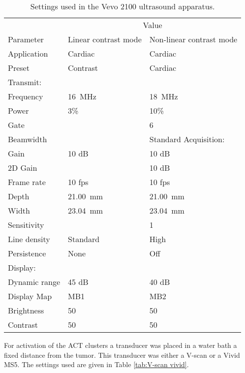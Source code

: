 \begin{table}[htb]
\caption{Settings used in the Vevo 2100 ultrasound apparatus.}
\label{tab:Vevo Ultrasound settings}
\begin{center}
\begin{tabular}{@{}l l l @{}}\toprule
& \multicolumn{2}{c}{Value} \\ \cmidrule(r){2-3}
Parameter & Linear contrast mode & Non-linear contrast mode\\
\midrule
Application & Cardiac & Cardiac\\
Preset & Contrast & Cardiac\\
Transmit:\\
Frequency & \SI{16}{\mega\hertz} & \SI{18}{\mega\hertz}\\
Power & 3\% & 10\%\\
Gate & & 6\\
Beamwidth & & Standard
Acquisition:\\
Gain & 10 dB & 10 dB\\
2D Gain & & 10 dB\\  
Frame rate & 10 fps & 10 fps\\
Depth & \SI{21.00}{\milli\meter} & \SI{21.00}{\milli\meter}\\
Width & \SI{23.04}{\milli\meter} & \SI{23.04}{\milli\meter}\\
Sensitivity & &1\\
Line density & Standard & High \\ 
Persistence & None & Off \\
Display:\\
Dynamic range &45 dB &40 dB \\
Display Map & MB1 & MB2\\
Brightness & 50 & 50\\
Contrast & 50 & 50 \\
  \bottomrule
\end{tabular}
\end{center}
\end{table}

For activation of the ACT\texttrademark{} clusters a transducer was placed in a water bath a fixed distance from the tumor. This transducer was either a V-scan or a Vivid MS5. The settings used are given in Table \ref{tab:V-scan vivid}.

